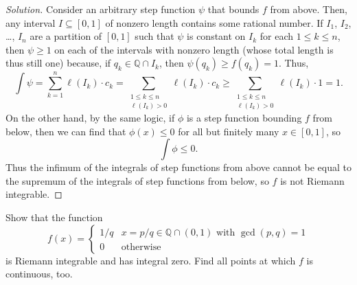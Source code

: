 \documentclass[11pt]{scrartcl}
\providecommand{\QQ}{\mathbb Q}
\newenvironment{soln}{\begin{proof}[Solution]}{\end{proof}}
\begin{document}
\begin{soln}
	Consider an arbitrary step function $\psi$ that bounds $f$ from above.
	Then, any interval $I\subseteq[0,1]$ of nonzero length
	contains some rational number. If $I_1$, $I_2$, \dots, $I_n$
	are a partition of $[0,1]$ such that $\psi$ is constant on $I_k$
	for each $1\le k\le n$, then $\psi \ge 1$
	on each of the intervals with nonzero length
	(whose total length is thus still one) because, if $q_k\in\QQ\cap I_k$,
	then $\psi(q_k) \ge f(q_k) = 1$.
	Thus,
	\[\int \psi = \sum_{k=1}^n \ell(I_k)\cdot c_k
	= \sum_{\substack{1\le k\le n \\ \ell(I_k) > 0}} \ell(I_k)\cdot c_k
	\ge \sum_{\substack{1\le k\le n \\ \ell(I_k) > 0}} \ell(I_k)\cdot 1 = 1.\]
	On the other hand, by the same logic, if $\phi$ is a step function
	bounding $f$ from below, then we can find that
	$\phi(x) \le 0$ for all but finitely many $x\in[0,1]$, so
	\[\int \phi \le 0.\]
	Thus the infimum of the integrals of step functions from above cannot
	be equal to the supremum of the integrals of step functions from below,
	so $f$ is not Riemann integrable.
\end{soln}

\setcounter{problem}{4}

\begin{problem}
	Show that the function
	\[f(x) = \begin{cases}
		1/q & x = p/q\in\QQ\cap(0,1)\text{ with }\gcd(p,q) = 1\\
		0 & \text{otherwise}
	\end{cases}\]
	is Riemann integrable and has integral zero.
	Find all points at which $f$ is continuous, too.
\end{problem}
\end{document}
